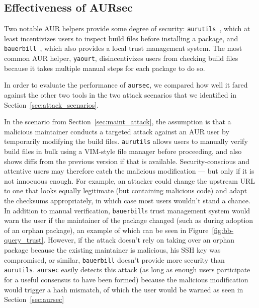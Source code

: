 
\label{sec:eval}
\subsection{Effectiveness of AURsec}\label{sec:security_comparison}
Two notable AUR helpers provide some degree of security: \texttt{aurutils}~\cite{gh:aurutils}, which at least incentivizes users to inspect build files before installing a package, and \texttt{bauerbill}~\cite{bauerbill}, which also provides a local trust management system.
The most common AUR helper, \texttt{yaourt}, disincentivizes users from checking build files because it takes multiple manual steps for each package to do so.

In order to evaluate the performance of \texttt{aursec}, we compared how well it fared against the other two tools in the two attack scenarios that we identified in Section~\ref{sec:attack_scenarios}.

In the scenario from Section~\ref{sec:maint_attack}, the assumption is that a malicious maintainer conducts a targeted attack against an AUR user by temporarily modifying the build files.
\texttt{aurutils} allows users to manually verify build files in bulk using a VIM-style file manager before proceeding, and also shows diffs from the previous version if that is available.
Security-conscious and attentive users may therefore catch the malicious modification --- but only if it is not innocuous enough.
For example, an attacker could change the upstream URL to one that looks equally legitimate (but containing malicious code) and adapt the checksums appropriately, in which case most users wouldn't stand a chance.
In addition to manual verification, \texttt{bauerbill}s trust management system would warn the user if the maintainer of the package changed (such as during adoption of an orphan package), an example of which can be seen in Figure~\ref{fig:bb-query_trust}.
However, if the attack doesn't rely on taking over an orphan package because the existing maintainer is malicious, his SSH key was compromised, or similar, \texttt{bauerbill} doesn't provide more security than \texttt{aurutils}.
\texttt{aursec} easily detects this attack (as long as enough users participate for a useful consensus to have been formed) because the malicious modification would trigger a hash mismatch, of which the user would be warned as seen in Section~\ref{sec:aursec}

